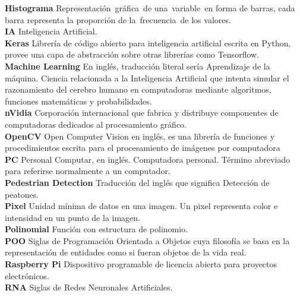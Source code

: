 \documentclass[a4paper,12pt,oneside,spanish]{book}
\begin{document}
\textbf{Histograma} Representación gráfica de una variable en forma de barras, cada barra representa la proporción de la frecuencia de los valores.\\
 
\textbf{IA} Inteligencia Artificial.\\
 
\textbf{Keras} Librería de código abierto para inteligencia artificial escrita en Python, provee una capa de abstracción sobre otras librerías como Tensorflow.\\
 
\textbf{Machine Learning} En inglés, traducción literal sería Aprendizaje de la máquina. Ciencia relacionada a la Inteligencia Artificial que intenta simular el razonamiento del cerebro humano en computadoras mediante algoritmos, funciones matemáticas y probabilidades.\\
 
\textbf{nVidia} Corporación internacional que fabrica y distribuye componentes de computadoras dedicados al procesamiento gráfico.\\
 
\textbf{OpenCV} Open Computer Vision en inglés, es una librería de funciones y procedimientos escrita para el procesamiento de imágenes por computadora\\
 
\textbf{PC} Personal Computar, en inglés. Computadora personal. Término abreviado para referirse normalmente a un computador.\\
 
\textbf{Pedestrian Detection} Traducción del inglés que significa Detección de peatones.\\
\textbf{Pixel} Unidad mínima de datos en una imagen. Un pixel representa color e intensidad en un punto de la imagen.\\
 
\textbf{Polinomial} Función con estructura de polinomio.\\
 
\textbf{POO} Siglas de Programación Orientada a Objetos cuya filosofía se basa en la representación de entidades como si fueran objetos de la vida real.\\
 
\textbf{Raspberry Pi} Dispositivo programable de licencia abierta para proyectos electrónicos.\\
 
\textbf{RNA} Siglas de Redes Neuronales Artificiales.\\
\end{document}
